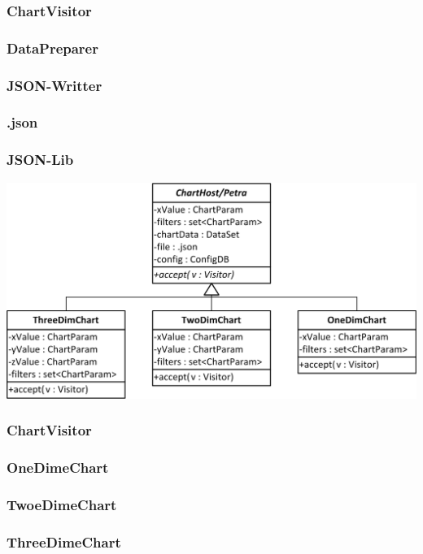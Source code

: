 \subsubsection*{ChartVisitor}
\subsubsection*{DataPreparer}
\subsubsection*{JSON-Writter}
\subsubsection*{.json}
\subsubsection*{JSON-Lib}


\begin{center}
\includegraphics{Pictures/Parts/Petra.png}
\end{center}  
\subsubsection*{ChartVisitor}
\subsubsection*{OneDimeChart}
\subsubsection*{TwoeDimeChart}
\subsubsection*{ThreeDimeChart} 


